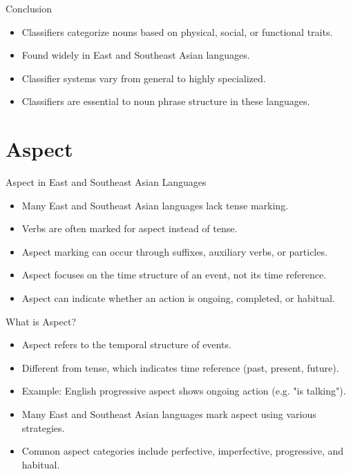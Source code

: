 \documentclass{beamer}
\begin{document}
\begin{frame}{Conclusion}
\begin{itemize}
    \item Classifiers categorize nouns based on physical, social, or functional traits.
    \item Found widely in East and Southeast Asian languages.
    \item Classifier systems vary from general to highly specialized.
    \item Classifiers are essential to noun phrase structure in these languages.
\end{itemize}
\end{frame}

\section{Aspect}

\begin{frame}{Aspect in East and Southeast Asian Languages}
\begin{itemize}
    \item Many East and Southeast Asian languages lack tense marking.
    \item Verbs are often marked for aspect instead of tense.
    \item Aspect marking can occur through suffixes, auxiliary verbs, or particles.
    \item Aspect focuses on the time structure of an event, not its time reference.
    \item Aspect can indicate whether an action is ongoing, completed, or habitual.
\end{itemize}
\end{frame}

\begin{frame}{What is Aspect?}
\begin{itemize}
    \item Aspect refers to the temporal structure of events.
    \item Different from tense, which indicates time reference (past, present, future).
    \item Example: English progressive aspect shows ongoing action (e.g. "is talking").
    \item Many East and Southeast Asian languages mark aspect using various strategies.
    \item Common aspect categories include perfective, imperfective, progressive, and habitual.
\end{itemize}
\end{frame}
\end{document}
